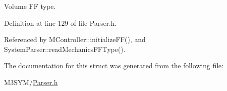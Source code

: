 Volume F\+F type. 



Definition at line 129 of file Parser.\+h.



Referenced by M\+Controller\+::initialize\+F\+F(), and System\+Parser\+::read\+Mechanics\+F\+F\+Type().



The documentation for this struct was generated from the following file\+:\begin{DoxyCompactItemize}
\item 
M3\+S\+Y\+M/\hyperlink{Parser_8h}{Parser.\+h}\end{DoxyCompactItemize}
